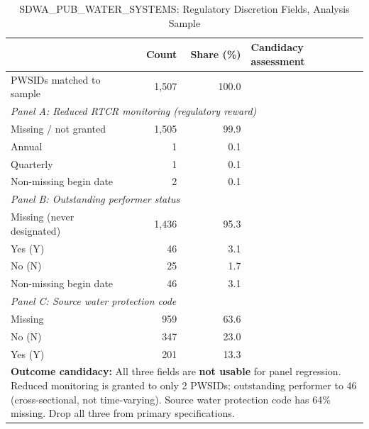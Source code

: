 \begin{table}[h!]
\centering
\caption{SDWA\_PUB\_WATER\_SYSTEMS: Regulatory Discretion Fields, Analysis Sample}
\label{tab:profile_pws}
\small
\begin{tabular}{p{5.5cm}rrl}
\hline\hline
 & Count & Share (\%) & Candidacy assessment \\
\hline
PWSIDs matched to sample & 1,507 & 100.0 & \\[6pt]

\multicolumn{4}{l}{\textit{Panel A: Reduced RTCR monitoring (regulatory reward)}} \\
Missing / not granted & 1,505 & 99.9 & \\
Annual & 1 & 0.1 & \\
Quarterly & 1 & 0.1 & \\
Non-missing begin date & 2 & 0.1 & \\[6pt]

\multicolumn{4}{l}{\textit{Panel B: Outstanding performer status}} \\
Missing (never designated) & 1,436 & 95.3 & \\
Yes (Y) & 46 & 3.1 & \\
No (N) & 25 & 1.7 & \\
Non-missing begin date & 46 & 3.1 & \\[6pt]

\multicolumn{4}{l}{\textit{Panel C: Source water protection code}} \\
Missing & 959 & 63.6 & \\
No (N) & 347 & 23.0 & \\
Yes (Y) & 201 & 13.3 & \\
\hline\hline
\multicolumn{4}{p{13cm}}{\footnotesize \textbf{Outcome candidacy:} All three fields are \textbf{not usable} for panel regression. Reduced monitoring is granted to only 2 PWSIDs; outstanding performer to 46 (cross-sectional, not time-varying). Source water protection code has 64\% missing. Drop all three from primary specifications.} \\
\end{tabular}
\end{table}

